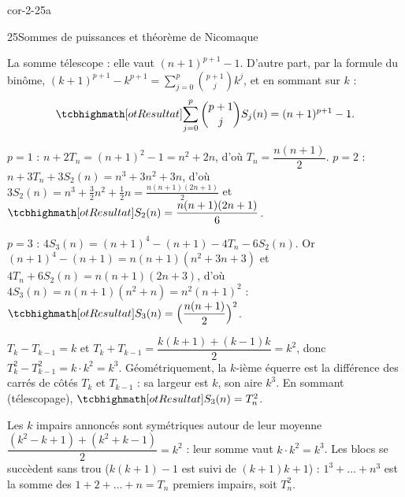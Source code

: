 
\begin{blocLivre}{cor-2-25a}
\begin{corrige}{25}{Sommes de puissances et théorème de Nicomaque}
\begin{questions}
  \item La somme télescope : elle vaut $(n+1)^{p+1}-1$. D'autre part,
    par la formule du binôme,
    $(k+1)^{p+1}-k^{p+1}=\sum_{j=0}^{p}\binom{p+1}{j}k^{j}$, et en
    sommant sur $k$ :
    \[
    \res{\sum_{j=0}^{p}\binom{p+1}{j}S_j(n)=(n+1)^{p+1}-1} .
    \]
  \item $p=1$ : $n+2T_n=(n+1)^{2}-1=n^{2}+2n$, d'où
    $T_n=\dfrac{n(n+1)}{2}$. $p=2$ :
    $n+3T_n+3S_2(n)=n^{3}+3n^{2}+3n$, d'où
    $3S_2(n)=n^{3}+\tfrac32n^{2}+\tfrac12n=\tfrac{n(n+1)(2n+1)}{2}$ et
    $\res{S_2(n)=\dfrac{n(n+1)(2n+1)}{6}}$.
  \item $p=3$ : $4S_3(n)=(n+1)^{4}-(n+1)-4T_n-6S_2(n)$. Or
    $(n+1)^{4}-(n+1)=n(n+1)(n^{2}+3n+3)$ et
    $4T_n+6S_2(n)=n(n+1)(2n+3)$, d'où
    $4S_3(n)=n(n+1)(n^{2}+n)=n^{2}(n+1)^{2}$ :
    $\res{S_3(n)=\Bigl(\dfrac{n(n+1)}{2}\Bigr)^{2}}$.
\end{questions}
\begin{questions}[resume]
  \item $T_k-T_{k-1}=k$ et $T_k+T_{k-1}=\dfrac{k(k+1)+(k-1)k}{2}=k^{2}$,
    donc $T_k^{2}-T_{k-1}^{2}=k\cdot k^{2}=k^{3}$. Géométriquement, la
    $k$-ième équerre est la différence des carrés de côtés $T_k$ et
    $T_{k-1}$ : sa largeur est $k$, son aire $k^{3}$. En sommant
    (télescopage), $\res{S_3(n)=T_n^{2}}$.
  \item Les $k$ impairs annoncés sont symétriques autour de leur moyenne
    $\dfrac{(k^{2}-k+1)+(k^{2}+k-1)}{2}=k^{2}$ : leur somme vaut
    $k\cdot k^{2}=k^{3}$. Les blocs se succèdent sans trou ($k(k+1)-1$ est
    suivi de $(k+1)k+1$) : $1^{3}+\dots+n^{3}$ est la somme des
    $1+2+\dots+n=T_n$ premiers impairs, soit $T_n^{2}$.
\end{questions}
\end{corrige}
\end{blocLivre}

